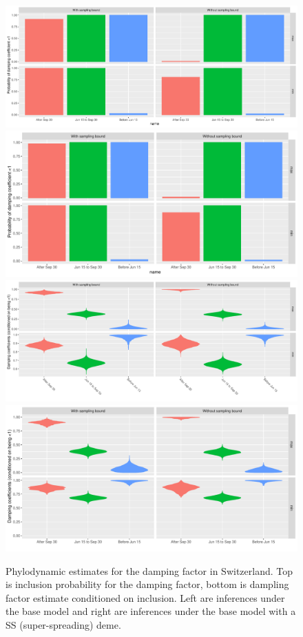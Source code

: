 \documentclass[9pt,twoside,lineno]{pnas-new}
\begin{document}
\begin{figure}[tbhp]
\centering
\includegraphics[width=0.4\linewidth]{figures/bdsky_2021-08-18/CT_dampingProbs_CHE_1deme.pdf}
\includegraphics[width=0.4\linewidth]{figures/bdsky_2021-08-18/CT_dampingProbs_2deme.pdf}
\includegraphics[width=0.4\linewidth]{figures/bdsky_2021-08-18/CT_conditionedDamping_CHE_1deme.pdf}
\includegraphics[width=0.4\linewidth]{figures/bdsky_2021-08-18/CT_conditionedDamping_2deme.pdf}
\caption{Phylodynamic estimates for the damping factor in Switzerland. Top is inclusion probability for the damping factor, bottom is dampling factor estimate conditioned on inclusion. Left are inferences under the base model and right are inferences under the base model with a SS (super-spreading) deme.}  
\label{fig:1vs2demeDampingFactorResults}
\end{figure}
\newpage
\end{document}
